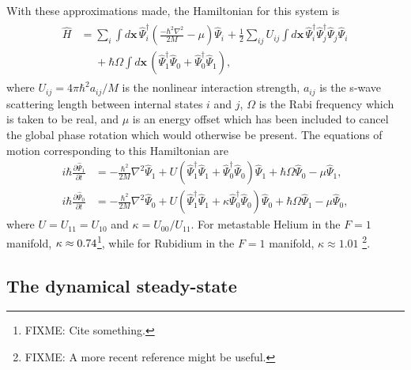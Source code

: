 With these approximations made, the Hamiltonian for this system is
\begin{align}
    \label{Peaks:InitialHamiltonian}
    \begin{split}
    \hat{H} &= \sum_i \int d\bm{x}\, \hat{\Psi}_i^\dagger \left(\frac{-\hbar^2 \nabla^2}{2 M} - \mu\right)\hat{\Psi}_i^{\phantom{\dagger}} + \frac{1}{2} \sum_{i j} U_{i j}\int d\bm{x}\, \hat{\Psi}_i^\dagger \hat{\Psi}_j^\dagger \hat{\Psi}_j^{\phantom{\dagger}} \hat{\Psi}_i^{\phantom{\dagger}}\\
            &\phantom{=} + \hbar \Omega \int d\bm{x}\, \left(\hat{\Psi}_1^\dagger \hat{\Psi}_0^{\phantom{\dagger}} + \hat{\Psi}_0^\dagger \hat{\Psi}_1^{\phantom{\dagger}}\right),
    \end{split}
\end{align}
where $U_{ij} = 4\pi \hbar^2 a_{ij}/M$ is the nonlinear interaction strength, $a_{ij}$ is the s-wave scattering length between internal states $i$ and $j$, $\Omega$ is the Rabi frequency which is taken to be real, and $\mu$ is an energy offset which has been included to cancel the global phase rotation which would otherwise be present. The equations of motion corresponding to this Hamiltonian are
\begin{subequations}
    \label{Peaks:OperatorEquationsOfMotion}
    \begin{align}
    i \hbar \frac{\partial \hat{\Psi}_1}{\partial t}  &= -\frac{\hbar^2}{2M}\nabla^2 \hat{\Psi}_1  + U \left(\hat{\Psi}_1^\dagger \hat{\Psi}_1^{\phantom{\dagger}} + \hat{\Psi}_0^\dagger \hat{\Psi}_0^{\phantom{\dagger}}\right) \hat{\Psi}_1 + \hbar \Omega \hat{\Psi}_0 - \mu \hat{\Psi}_1,  \\
    i \hbar \frac{\partial \hat{\Psi}_0}{\partial t} &= -\frac{\hbar^2}{2M} \nabla^2 \hat{\Psi}_0 + U \left(\hat{\Psi}_1^\dagger \hat{\Psi}_1^{\phantom{\dagger}} + \kappa \hat{\Psi}_0^\dagger \hat{\Psi}_0^{\phantom{\dagger}} \right) \hat{\Psi}_0 + \hbar \Omega \hat{\Psi}_1 - \mu \hat{\Psi}_0,
    \end{align}
\end{subequations}
where $U=U_{11}=U_{10}$ and $\kappa = U_{00}/U_{11}$. For metastable Helium in the $F=1$ manifold, $\protect{\kappa \approx 0.74}$\footnote{FIXME: Cite something.}, while for Rubidium in the $F=1$ manifold, $\kappa \approx 1.01$ \cite{Ho:1998}\footnote{FIXME: A more recent reference might be useful.}. 

\subsection{The dynamical steady-state}
\label{Peaks:MeanFieldPeriodicity}

